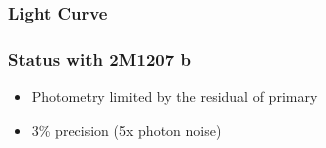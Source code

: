 \documentclass[14pt]{beamer}
\begin{document}
\begin{frame}
  \frametitle{Light Curve}
\end{frame}

\begin{frame}
  \frametitle{Status with 2M1207 b}
  \begin{itemize}
  \item Photometry limited by the residual of primary
  \item 3\% precision (5x photon noise)
  \end{itemize}
\end{frame}
\end{document}
